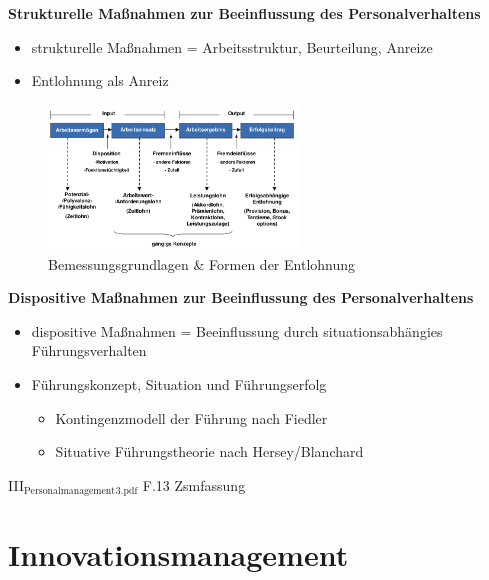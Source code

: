 \documentclass[11pt]{article}
\begin{document}
\textbf{Strukturelle Maßnahmen zur Beeinflussung des Personalverhaltens}
\begin{itemize}
\item strukturelle Maßnahmen = Arbeitsstruktur, Beurteilung, Anreize
\item Entlohnung als Anreiz
\end{itemize}
\begin{figure}[htbp]
\centering
\includegraphics[width=250px]{./pictures/persentl.png}
\caption{Bemessungsgrundlagen \& Formen der Entlohnung}
\end{figure} 



\textbf{Dispositive Maßnahmen zur Beeinflussung des Personalverhaltens}
\begin{itemize}
\item dispositive Maßnahmen = Beeinflussung durch situationsabhängies Führungsverhalten
\item Führungskonzept, Situation und Führungserfolg
\begin{itemize}
\item Kontingenzmodell der Führung nach Fiedler
\item Situative Führungstheorie nach Hersey/Blanchard
\end{itemize}
\end{itemize}

III\(_{\text{Personalmanagement}}\)\(_{\text{3.pdf}}\) F.13 Zsmfassung
\section{Innovationsmanagement}
\label{sec:org7f0f914}
\end{document}
